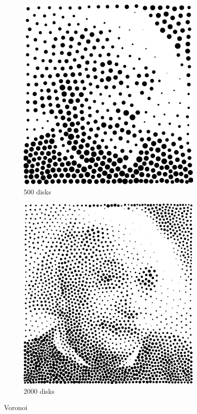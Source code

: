 \documentclass[11pt]{article}
\begin{document}
\begin{enumerate}
\begin{figure}[H]
    \centering
        \begin{subfigure}{0.4\textwidth}
        \centering
        \includegraphics[width=\textwidth]{../results/voronoi/2-1.pdf}
 \caption{500 disks}
    \end{subfigure}
    \begin{subfigure}{0.4\textwidth}
        \centering
        \includegraphics[width=\textwidth]{../results/voronoi/2-2.pdf}
 \caption{2000 disks}
    \end{subfigure}
    \caption{Voronoi}
    \label{fig:2}
\end{figure}


\end{enumerate}
\end{document}
